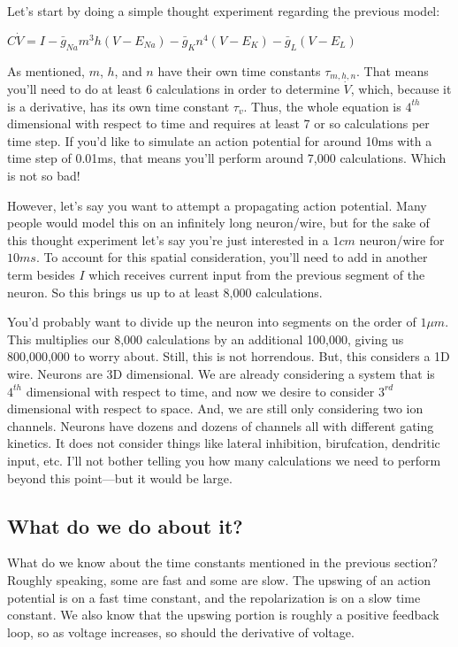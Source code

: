 \documentclass[12pt]{amsart}
\begin{document}
Let's start by doing a simple thought experiment regarding the previous model: 

\bigskip

\begin{center}

    $C\dot{V} = I - \bar{g}_{Na}m^3h(V - E_{Na}) - \bar{g}_{K}n^4(V - E_{K}) - \bar{g}_{L}(V - E_{L})$
    
\end{center}

\bigskip

As mentioned, $m$, $h$, and $n$ have their own time constants $\tau_{m,h,n}$. That means you'll need to do at least 6 calculations in order to determine $\dot{V}$, which, because it is a derivative, has its own time constant $\tau_v$. Thus, the whole equation is $4^{th}$ dimensional with respect to time and requires at least 7 or so calculations per time step. If you'd like to simulate an action potential for around 10ms with a time step of 0.01ms, that means you'll perform around 7,000 calculations. Which is not so bad!\newline 

However, let's say you want to attempt a propagating action potential. Many people would model this on an infinitely long neuron/wire, but for the sake of this thought experiment let's say you're just interested in a $1cm$ neuron/wire for $10ms$. To account for this spatial consideration, you'll need to add in another term besides $I$ which receives  current input from the previous segment of the neuron. So this brings us up to at least 8,000 calculations.\newline

You'd probably want to divide up the neuron into segments on the order of $1\mu m$. This multiplies our 8,000 calculations by an additional 100,000, giving us 800,000,000 to worry about. Still, this is not horrendous. But, this considers a 1D wire. Neurons are 3D dimensional. We are already considering a system that is $4^{th}$ dimensional with respect to time, and now we desire to consider $3^{rd}$ dimensional with respect to space. And, we are still only considering two ion channels. Neurons have dozens and dozens of channels all with different gating kinetics. It does not consider things like lateral inhibition, birufcation, dendritic input, etc. I'll not bother telling you how many calculations we need to perform beyond this point---but it would be large. 

\subsection{What do we do about it?} What do we know about the time constants mentioned in the previous section? Roughly speaking, some are fast and some are slow. The upswing of an action potential is on a fast time constant, and the repolarization is on a slow time constant. We also know that the upswing portion is roughly a positive feedback loop, so as voltage increases, so should the derivative of voltage.\newline
\end{document}
